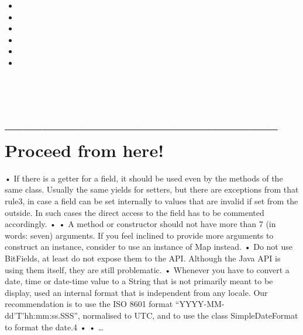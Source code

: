 \documentclass[11pt,a4paper, titlepage, parskip=half, headsepline, footsepline, cleardoublepage=current, headheight=1cm]{scrbook}
\begin{document}
\begin{itemize}
{If an expression containing a binary operator appears before the “\verb#?#” in the ternary “\verb#?:#” operator, it should be parenthesized.
 
Example:
\begin{lstlisting}
(x >= 0) ? x : -x;
\end{lstlisting}
}

\item{}

\item{}

\item{}

\item{}

\item{}

\item{}
\end{itemize}

\begin{lstlisting}
\end{lstlisting}

\begin{lstlisting}
\end{lstlisting}

\begin{lstlisting}
\end{lstlisting}

\section{-------------------------------------------- Proceed from here!}
    • If there is a getter for a field, it should be used even by the methods of the same class. Usually the same yields for setters, but there are exceptions from that rule3, in case a field can be set internally to values that are invalid if set from the outside. In such cases the direct access to the field has to be commented accordingly.
    • 
    • A method or constructor should not have more than 7 (in words: seven) arguments. If you feel inclined to provide more arguments to construct an instance, consider to use an instance of Map instead.
    • Do not use BitFields, at least do not expose them to the API. Although the Java API is using them itself, they are still problematic.
    • Whenever you have to convert a date, time or date-time value to a String that is not primarily meant to be display, used an internal format that is independent from any locale. Our recommendation is to use the ISO 8601 format “YYYY-MM-dd'T'hh:mm:ss.SSS”, normalised to UTC, and to use the class SimpleDateFormat to format the date.4
    • 
    • …
\end{document}
